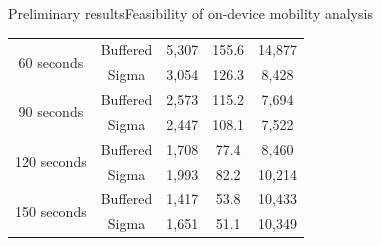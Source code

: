 \documentclass[9pt,xcolor={dvipsnames},handout]{beamer}
\begin{document}
\begin{frame}{Preliminary results}{Feasibility of on-device mobility analysis}
\begin{table}
{\begin{tabular}{@{}ccccc@{}}
\multirow{2}{*}{60 seconds} & Buffered & 5,307 & 155.6 & 14,877 \\
 & Sigma & 3,054 & 126.3 & 8,428 \\
 \cmidrule{2-5}

\multirow{2}{*}{90 seconds} & Buffered & 2,573 & 115.2 & 7,694 \\
 & Sigma & 2,447 & 108.1 & 7,522 \\
 \cmidrule{2-5}

\multirow{2}{*}{120 seconds} & Buffered & 1,708 & 77.4 & 8,460 \\
 & Sigma & 1,993 & 82.2 & 10,214 \\
 \cmidrule{2-5}

\multirow{2}{*}{150 seconds} & Buffered & 1,417 & 53.8 & 10,433 \\
 & Sigma & 1,651 & 51.1 & 10,349 \\
 \bottomrule
\end{tabular}%
}
\end{table}
\end{frame}
\end{document}
